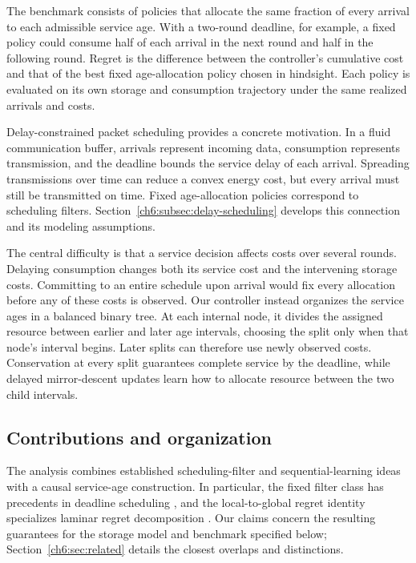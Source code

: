 \documentclass[11pt]{article}
\theoremstyle{plain}
\theoremstyle{remark}
\numberwithin{equation}{section}
\begin{document}
The benchmark consists of policies that allocate the same fraction of
every arrival to each admissible service age. With a two-round deadline,
for example, a fixed policy could consume half of each arrival in the next
round and half in the following round. Regret is the difference between
the controller's cumulative cost and that of the best fixed age-allocation
policy chosen in hindsight. Each policy is evaluated on its own storage
and consumption trajectory under the same realized arrivals and costs.

Delay-constrained packet scheduling provides a concrete motivation.
In a fluid communication buffer, arrivals represent incoming data,
consumption represents transmission, and the deadline bounds the service
delay of each arrival. Spreading transmissions over time can reduce a
convex energy cost, but every arrival must still be transmitted on time.
Fixed age-allocation policies correspond to scheduling filters.
Section~\ref{ch6:subsec:delay-scheduling} develops this connection and its
modeling assumptions.

The central difficulty is that a service decision affects costs over
several rounds. Delaying consumption changes both its service cost and
the intervening storage costs. Committing to an entire schedule upon
arrival would fix every allocation before any of these costs is observed.
Our controller instead organizes the service ages in a balanced binary
tree. At each internal node, it divides the assigned resource between
earlier and later age intervals, choosing the split only when that node's
interval begins. Later splits can therefore use newly observed costs.
Conservation at every split guarantees complete service by the deadline,
while delayed mirror-descent updates learn how to allocate resource
between the two child intervals.

\subsection{Contributions and organization}

The analysis combines established scheduling-filter and sequential-learning
ideas with a causal service-age construction. In particular, the fixed
filter class has precedents in deadline scheduling
\cite{khojastepour2004delay}, and the local-to-global regret identity
specializes laminar regret decomposition \cite{farina2019laminar}.
Our claims concern the resulting guarantees for the storage model and
benchmark specified below; Section~\ref{ch6:sec:related} details the
closest overlaps and distinctions.
\end{document}
